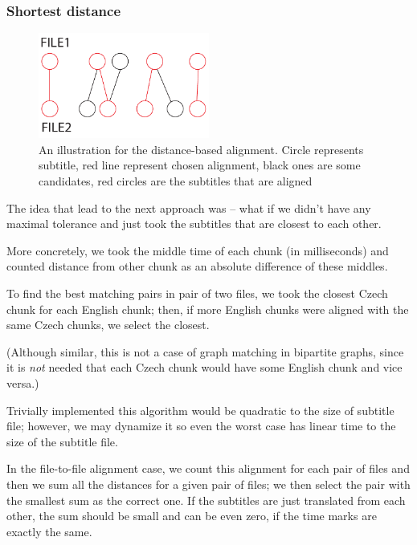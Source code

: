 \subsubsection{Shortest distance}
\begin{figure}[t]
\begin{center}
\includegraphics[width=0.5\textwidth]{figures/distance_align.pdf}
\end{center}
\caption{An illustration for the distance-based alignment. Circle represents subtitle, red line represent chosen alignment, black ones are some candidates, red circles are the subtitles that are aligned}\label{histograms}
\end{figure}

The idea that lead to the next approach was -- what if we didn't have any maximal tolerance and just took the subtitles that are closest to each other.

More concretely, we took the middle time of each chunk (in milliseconds) and counted distance from other chunk as an absolute difference of these middles. 

To find the best matching pairs in pair of two files, we took the closest Czech chunk for each English chunk; then, if more English chunks were aligned with the same Czech chunks, we select the closest.

(Although similar, this is not a case of graph matching in bipartite graphs, since it is \emph{not} needed that each Czech chunk would have some English chunk and vice versa.)

Trivially implemented this algorithm would be quadratic to the size of subtitle file; however, we may dynamize it so even the worst case has linear time to the size of the subtitle file.

In the file-to-file alignment case, we count this alignment for each pair of files and then we sum all the distances for a given pair of files; we then select the pair with the smallest sum as the correct one. If the subtitles are just translated from each other, the sum should be small and can be even zero, if the time marks are exactly the same.

